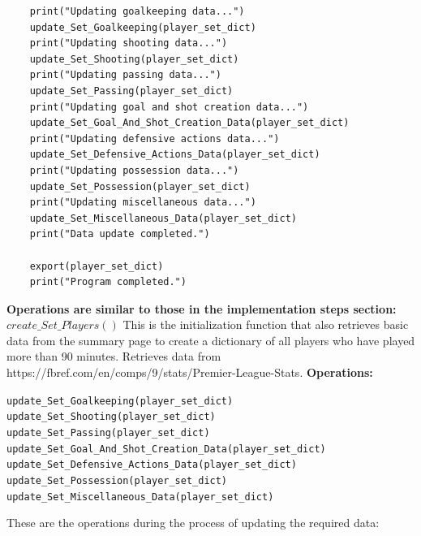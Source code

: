\documentclass[12pt]{report}
\begin{document}
{\begin{lstlisting}
	print("Updating goalkeeping data...")
	update_Set_Goalkeeping(player_set_dict)
	print("Updating shooting data...")
	update_Set_Shooting(player_set_dict)
	print("Updating passing data...")
	update_Set_Passing(player_set_dict)
	print("Updating goal and shot creation data...")
	update_Set_Goal_And_Shot_Creation_Data(player_set_dict)
	print("Updating defensive actions data...")
	update_Set_Defensive_Actions_Data(player_set_dict)
	print("Updating possession data...")
	update_Set_Possession(player_set_dict)
	print("Updating miscellaneous data...")
	update_Set_Miscellaneous_Data(player_set_dict)
	print("Data update completed.")

	export(player_set_dict)
	print("Program completed.")
\end{lstlisting}
\textbf{Operations are similar to those in the implementation steps section:} %
\textbf{$create\_Set\_Players()$} This is the initialization function that also retrieves basic data from the summary page to create a dictionary of all players who have played more than 90 minutes. Retrieves data from https://fbref.com/en/comps/9/stats/Premier-League-Stats.
\textbf{Operations:} %
\begin{flushleft}
\texttt{update\_Set\_Goalkeeping(player\_set\_dict)}\\
\texttt{update\_Set\_Shooting(player\_set\_dict)}\\
\texttt{update\_Set\_Passing(player\_set\_dict)}\\
\texttt{update\_Set\_Goal\_And\_Shot\_Creation\_Data(player\_set\_dict)}\\
\texttt{update\_Set\_Defensive\_Actions\_Data(player\_set\_dict)}\\
\texttt{update\_Set\_Possession(player\_set\_dict)}\\
\texttt{update\_Set\_Miscellaneous\_Data(player\_set\_dict)}\\
\end{flushleft}
These are the operations during the process of updating the required data: %

}
\end{document}
